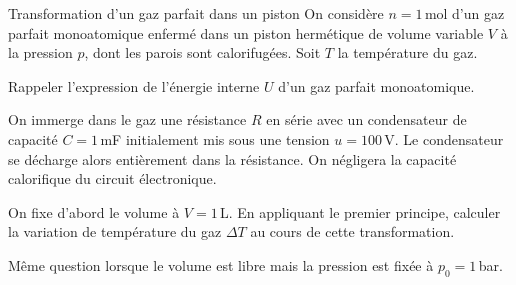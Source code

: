 \begin{exo}[PT][1][devoir]{Transformation d'un gaz parfait dans un piston}
On considère $n=1\,$mol d'un gaz parfait monoatomique enfermé dans un piston hermétique de volume variable $V$ à la pression $p$, dont les parois sont calorifugées. Soit $T$ la température du gaz.

\begin{quest}
	\item Rappeler l'expression de l'énergie interne $U$ d'un gaz parfait monoatomique.


\end{quest}
On immerge dans le gaz une résistance $R$ en série avec un condensateur de capacité $C=1\,$mF initialement mis sous une tension $u=100\,$V. Le condensateur se décharge alors entièrement dans la résistance. On négligera la capacité calorifique du circuit électronique.
\begin{quest}
\setcounter{enumi}{1}
	\item\label{quest:U_GP} On fixe d'abord le volume à $V=1\,$L. En appliquant le premier principe, calculer la variation de température du gaz $\Delta T$ au cours de cette transformation.

	\item Même question lorsque le volume est libre mais la pression est fixée à $p_0=1\,$bar.

\end{quest}
\end{exo}

